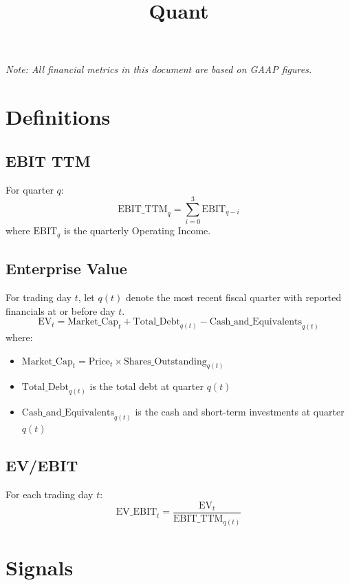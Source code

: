 \documentclass{article}
\title{Quant}
\date{}
\begin{document}
\maketitle

\begin{center}
\textit{Note: All financial metrics in this document are based on GAAP figures.}
\end{center}

\tableofcontents

\newpage
\section{Definitions}

\subsection{EBIT TTM}

For quarter $q$:
\[
    \text{EBIT\_TTM}_q = \sum_{i=0}^{3} \text{EBIT}_{q-i}
\]
where $\text{EBIT}_q$ is the quarterly Operating Income.

\subsection{Enterprise Value}

For trading day $t$, let $q(t)$ denote the most recent fiscal quarter with reported financials at or before day $t$.
\[
    \text{EV}_t = \text{Market\_Cap}_t + \text{Total\_Debt}_{q(t)} - \text{Cash\_and\_Equivalents}_{q(t)}
\]
where:
\begin{itemize}
    \item $\text{Market\_Cap}_t = \text{Price}_t \times \text{Shares\_Outstanding}_{q(t)}$
    \item $\text{Total\_Debt}_{q(t)}$ is the total debt at quarter $q(t)$
    \item $\text{Cash\_and\_Equivalents}_{q(t)}$ is the cash and short-term investments at quarter $q(t)$
\end{itemize}

\subsection{EV/EBIT}

For each trading day $t$:
\[
    \text{EV\_EBIT}_t = \frac{\text{EV}_t}{\text{EBIT\_TTM}_{q(t)}}
\]


\newpage
\section{Signals}
\end{document}
